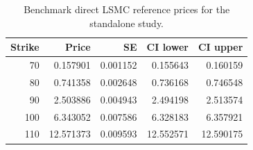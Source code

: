 \begin{table}[htbp]
\centering
\caption{Benchmark direct LSMC reference prices for the standalone study.}
\label{tab:bgk_r03_v004_t1_delta05_nex12-benchmark-references}
\begin{tabular}{rrrrr}
\toprule
Strike & Price & SE & CI lower & CI upper \\
\midrule
70 & 0.157901 & 0.001152 & 0.155643 & 0.160159 \\
80 & 0.741358 & 0.002648 & 0.736168 & 0.746548 \\
90 & 2.503886 & 0.004943 & 2.494198 & 2.513574 \\
100 & 6.343052 & 0.007586 & 6.328183 & 6.357921 \\
110 & 12.571373 & 0.009593 & 12.552571 & 12.590175 \\
\bottomrule
\end{tabular}
\end{table}
